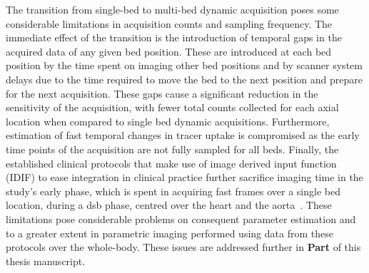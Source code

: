 The transition from single-bed to multi-bed dynamic acquisition poses some considerable limitations in acquisition counts and sampling frequency. The immediate effect of the transition is the introduction of temporal gaps in the acquired data of any given bed position. These are introduced at each bed position by the time spent on imaging other bed positions and by scanner system delays due to the time required to move the bed to the next position and prepare for the next acquisition. These gaps cause a significant reduction in the sensitivity of the acquisition, with fewer total counts collected for each axial location when compared to single bed dynamic acquisitions. Furthermore, estimation of fast temporal changes in tracer uptake is compromised as the early time points of the acquisition are not fully sampled for all beds. Finally, the established clinical protocols that make use of image derived input function (IDIF) to ease integration in clinical practice further sacrifice imaging time in the study’s early phase, which is spent in acquiring fast frames over a single bed location, during a \gls{dsb} phase, centred over the heart and the aorta~\cite{Karakatsanis2013,Hu2020}.
These limitations pose considerable problems on consequent parameter estimation and to a greater extent in parametric imaging performed using data from these protocols over the whole-body. These issues are addressed further in \textbf{Part } of this thesis manuscript.
%
%

